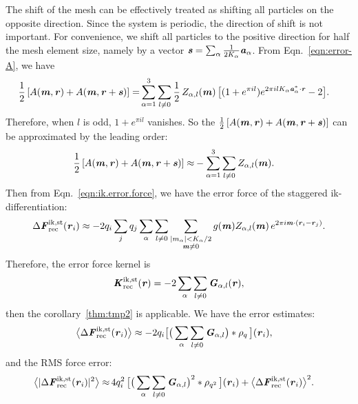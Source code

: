 \documentclass[aps,pre,preprint]{revtex4}
\renewcommand{\v}[1]{\textbf{\textit{#1}}}
\begin{document}
The shift of the mesh can be effectively treated as shifting all
particles on the opposite direction. Since the system is periodic,
the direction of shift is not important. For convenience, we shift
all particles to the positive direction for half the mesh element size, namely
by a vector $\v s = \sum_\alpha\frac1{2K_\alpha}\v a_\alpha$. From
Eqn.~\eqref{eqn:error-A}, we have
\begin{align}
  \frac12\, [A(\v m, \v r) + A(\v m, \v r+\v s)]
  =&
  \sum_{\alpha=1}^3\sum_{l\neq 0}
  \frac12\,
  Z_{\alpha,l}(\v m)\,
  \big[
  (1 + e^{\pi i l})e^{2\pi i l K_\alpha\v a^\ast_\alpha\cdot \v r} - 2
  \big].
\end{align}
Therefore, when $l$ is odd, $1 + e^{\pi i l}$ vanishes. So the $\frac12\,[A(\v
m, \v r) + A(\v m, \v r+\v s)]$ can be approximated by the leading
order:
\begin{align}
  \frac12\, [A(\v m, \v r) + A(\v m, \v r+\v s)]
  \approx&
  -\sum_{\alpha=1}^3\sum_{l\neq 0}
  Z_{\alpha,l}(\v m).
\end{align}
Then from Eqn.~\eqref{eqn:ik.error.force}, we have the error force of
the staggered ik-differentiation:
\begin{align}\label{eqn:ik-st-error-force}
  \Delta\v F^{\textrm{ik,st}}_{\textrm{rec}}(\v r_i)
  \approx -2q_i
  \sum_jq_j
  \sum_\alpha\sum_{l\neq 0}
  \sum_{
    \begin{subarray}{c}
      \vert m_{\alpha}\vert < K_\alpha/2\\
      \v m\neq 0
    \end{subarray}}
  g(\v m) Z_{\alpha,l}(\v m)\,e^{2\pi i\v m\cdot(\v r_i-\v r_j)}.
\end{align}
Therefore, the error force kernel is
\begin{align}
  \v K^{\textrm{ik,st}}_{\textrm{rec}}(\v r)
  = -2
  \sum_\alpha\sum_{l\neq 0}\v G_{\alpha,l}(\v r),
\end{align}
then the corollary~\ref{thm:tmp2} is applicable.
We have the error estimates:
\begin{align}\label{eqn:ik.st.meanf}
  \big\langle
  \Delta\v F_{\textrm{rec}}^{\textrm{ik,st}}(\v r_i)
  \big\rangle
  & \approx
  - 2 q_i
  \big[
  \big(
  \sum_{\alpha}\sum_{l\neq 0}\v G_{\alpha,l}
  \big)
  \ast\rho_q\,
  \big] (\v r_i),
\end{align}
and the RMS force error:
\begin{align}\label{eqn:ik.st.error}
  \big\langle
  \vert\Delta\v F_{\textrm{rec}}^{\textrm{ik,st}}(\v r_i)\vert^2
  \big\rangle
  \approx&\,
  4q_i^2\,
  \big[
  \big(
  \sum_{\alpha} \sum_{l\neq 0}  
  \v G_{\alpha,l}
  \big)^2
  \ast \rho_{q^2}\,
  \big] (\v r_i) +
  \big\langle
  \Delta\v F_{\textrm{rec}}^{\textrm{ik,st}}(\v r_i)
  \big\rangle^2.
\end{align}
\end{document}

